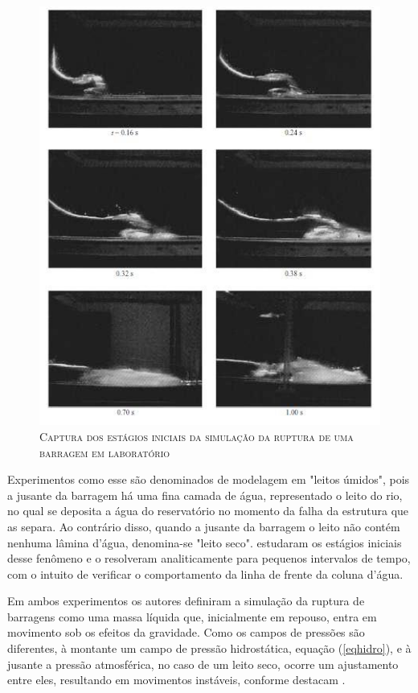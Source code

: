 \begin{figure}[H]
\centering
\includegraphics[scale=1]{figuras/captura.jpg}
\caption{\textsc{Captura dos estágios iniciais da simulação da ruptura de uma barragem em laboratório}}
\vspace{-0.1cm}
\label{fig:captura}
\end{figure}

Experimentos como esse são denominados de modelagem em "leitos úmidos", pois a jusante da barragem há uma fina camada de água, representado o leito do rio, no qual se deposita a água do reservatório no momento da falha da estrutura que as separa. Ao contrário disso, quando a jusante da barragem o leito não contém nenhuma lâmina d'água, denomina-se "leito seco".  estudaram os estágios iniciais desse fenômeno e o resolveram analiticamente para pequenos intervalos de tempo, com o intuito de verificar o comportamento da linha de frente da coluna d'água. 

Em ambos experimentos os autores definiram a simulação da ruptura de barragens como uma massa líquida que, inicialmente em repouso, entra em movimento sob os efeitos da gravidade. Como os campos de pressões são diferentes, à montante um campo de pressão hidrostática, equação (\ref{eqhidro}), e à jusante a pressão atmosférica, no caso de um leito seco, ocorre um ajustamento entre eles, resultando em movimentos instáveis, conforme destacam .

